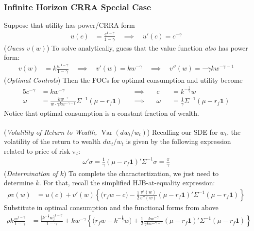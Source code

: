 \documentclass[12pt]{article}
\theoremstyle{plain}
\theoremstyle{definition}
\theoremstyle{remark}
\newcommand{\Var}{\operatorname{Var}}
\begin{document}
\subsubsection{Infinite Horizon CRRA Special Case}
Suppose that utility has power/CRRA form
\begin{align*}
  u(c) &= \frac{c^{1-\gamma}}{1-\gamma}
  \quad\implies\quad
  u'(c)
  =
  c^{-\gamma}
\end{align*}
(\emph{Guess $v(w)$})
To solve analytically, guess that the value function \emph{also} has
power form:
\begin{align*}
  v(w) &= k\frac{w^{1-\gamma}}{1-\gamma}
  \quad\implies\quad
  v'(w)
  =
  kw^{-\gamma}
  \quad\implies\quad
  v''(w)
  =
  -\gamma kw^{-\gamma-1}
\end{align*}
(\emph{Optimal Controls})
Then the FOCs for optimal consumption and utility become
\begin{alignat*}{5}
  c^{-\gamma}
  &=
  kw^{-\gamma}
  &
  \quad\implies\quad
  &
  c
  &&=
  k^{-\frac{1}{\gamma}}w
  \\
  \omega
  &=
  \frac{kw^{-\gamma}}{w\cdot \gamma kw^{-\gamma-1}}
  \Sigma^{-1}(\mu - r_f\mathbf{1})
  &
  \quad\implies\quad
  &
  \omega
  &&=
  \frac{1}{\gamma}
  \Sigma^{-1}(\mu - r_f\mathbf{1})
\end{alignat*}
Notice that optimal consumption is a constant fraction of wealth.
\\
\\
(\emph{Volatility of Return to Wealth, $\Var(dw_t/w_t)$})
Recalling our SDE for $w_t$, the volatility of the return to wealth
$dw_t/w_t$ is given by the following expression related to price of risk
$\pi_t$:
\begin{align*}
  \omega'\sigma
  =
  \frac{1}{\gamma}
  (\mu - r_f\mathbf{1})'\Sigma^{-1}
  \sigma
  =
  \frac{\pi}{\gamma}
\end{align*}
(\emph{Determination of $k$})
To complete the charactertization, we just need to determine $k$.
For that, recall the simplified HJB-at-equality expression:
\begin{align*}
  \rho v(w)
  &=
  u(c)
  +
  v'(w)
  \left\{
  \big(r_fw -c\big)
  -
  \frac{1}{2}
  \frac{v'(w)}{v''(w)}
  (\mu - r_f\mathbf{1})'
  \Sigma^{-1}
  (\mu - r_f\mathbf{1})
  \right\}
\end{align*}
Substitute in optimal consumption and the functional forms from above
\begin{align*}
  \rho
  k\frac{w^{1-\gamma}}{1-\gamma}
  &=
  \frac{\big[k^{-\frac{1}{\gamma}}w\big]^{1-\gamma}}{1-\gamma}
  +
  kw^{-\gamma}
  \left\{
  \big(r_fw -k^{-\frac{1}{\gamma}}w\big)
  +
  \frac{1}{2}
  \frac{kw^{-\gamma}}{\gamma k w^{-\gamma-1}}
  (\mu - r_f\mathbf{1})'
  \Sigma^{-1}
  (\mu - r_f\mathbf{1})
  \right\}
\end{align*}
\end{document}
